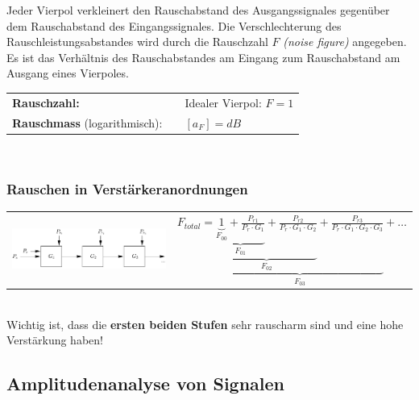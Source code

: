 		Jeder Vierpol verkleinert den Rauschabstand des Ausgangssignales gegenüber dem Rauschabstand des Eingangssignales.
		Die Verschlechterung des Rauschleistungsabstandes wird durch die Rauschzahl $F$ \textit{(noise figure)} angegeben.
		Es ist das Verhältnis des Rauschabstandes am Eingang zum Rauschabstand am Ausgang eines Vierpoles.\\
		
		\begin{tabular}{lll}
			\textbf{Rauschzahl:}
		&	\fbox{$F 	= \dfrac{\text{SNR}_{Eingang}}{\text{SNR}_{Ausgang}}
						= \dfrac{\frac{P_{sEingang}}{P_{rEingang}}}{\frac{P_{sAusgang}}{P_{rAusgang}}} 
						= \frac{P_{sEingang}}{P_{rEingang}} \cdot \frac{P_{rAusgang}}{P_{sAusgang}}$}
		&	Idealer Vierpol: $F = 1$
		\\
			\textbf{Rauschmass} (logarithmisch):
		&	\formel{$a_F = 10 \cdot log_{10} (F) = a_{rEingang} - a_{rAusgang}$}
		&	$[a_F] = dB$
		\end{tabular}\\
		
		\subsubsection{Rauschen in Verstärkeranordnungen }
		
			\begin{tabular}{ll}
				\parbox{8cm}{
					\includegraphics[width=8cm]{./bilder/rauschzahl.png}
				}
			&
				$F_{total} = \underbrace{\underbrace{\underbrace{\underbrace{
								1}_{F_{00}}
								+ \frac{P_{r1}}{P_r \cdot G_1}}_{F_{01}}
								+ \frac{P_{r2}}{P_r \cdot G_1 \cdot G_2}}_{F_{02}}
								+ \frac{P_{r3}}{P_r \cdot G_1 \cdot G_2 \cdot G_3} }_{F_{03}}
								+ \ldots $
			\end{tabular} \\
			Wichtig ist, dass die \textbf{ersten beiden Stufen} sehr rauscharm sind und eine hohe Verstärkung haben!
	
	\subsection{Amplitudenanalyse von Signalen }
	

